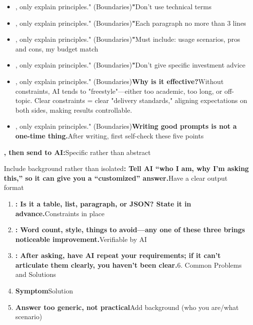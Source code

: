 \begin{itemize}
  \item , only explain principles." (Boundaries)\textbf{"}Don't use technical terms
  \item , only explain principles." (Boundaries)\textbf{"}Each paragraph no more than 3 lines
  \item , only explain principles." (Boundaries)\textbf{"}Must include: usage scenarios, pros and cons, my budget match
  \item , only explain principles." (Boundaries)\textbf{"}Don't give specific investment advice
  \item , only explain principles." (Boundaries)\textbf{Why is it effective?}Without constraints, AI tends to "freestyle"—either too academic, too long, or off-topic. Clear constraints = clear "delivery standards," aligning expectations on both sides, making results controllable.
  \item , only explain principles." (Boundaries)\textbf{Writing good prompts is not a one-time thing.}After writing, first self-check these five points
\end{itemize}

\textbf{, then send to AI:}Specific rather than abstract


Include background rather than isolated\textbf{: Tell AI “who I am, why I'm asking this,” so it can give you a “customized” answer.}Have a clear output format

\begin{enumerate}
  \item \textbf{: Is it a table, list, paragraph, or JSON? State it in advance.}Constraints in place
  \item \textbf{: Word count, style, things to avoid—any one of these three brings noticeable improvement.}Verifiable by AI
  \item \textbf{: After asking, have AI repeat your requirements; if it can't articulate them clearly, you haven't been clear.}6. Common Problems and Solutions
  \item \textbf{Symptom}Solution
  \item \textbf{Answer too generic, not practical}Add background (who you are/what scenario)
\end{enumerate}


